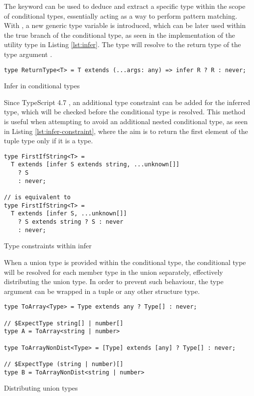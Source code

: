 The  keyword can be used to deduce and extract a specific type within the scope of conditional types, essentially acting as a way to perform pattern matching. With , a new generic type variable is introduced, which can be later used within the true branch of the conditional type, as seen in the implementation of the  utility type in Listing \ref{lst:infer}. The  type will resolve to the return type of the type argument .

\begin{listing}[ht]
  \begin{verbatim}
type ReturnType<T> = T extends (...args: any) => infer R ? R : never;
\end{verbatim}
  \caption{Infer in conditional types}\label{lst:infer}
\end{listing}

Since TypeScript 4.7 \cite{AnnouncingTypeScript4.7}, an additional type constraint can be added for the inferred type, which will be checked before the conditional type is resolved. This method is useful when attempting to avoid an additional nested conditional type, as seen in Listing \ref{lst:infer-constraint}, where the aim is to return the first element of the tuple type only if it is a  type.

\begin{listing}[ht]
  \begin{verbatim}
type FirstIfString<T> =
  T extends [infer S extends string, ...unknown[]]
    ? S
    : never;

// is equivalent to 
type FirstIfString<T> =
  T extends [infer S, ...unknown[]]
    ? S extends string ? S : never
    : never;
\end{verbatim}
  \caption{Type constraints within infer}\label{lst:infer-constraint}
\end{listing}

When a union type is provided within the conditional type, the conditional type will be resolved for each member type in the union separately, effectively distributing the union type. In order to prevent such behaviour, the type argument can be wrapped in a tuple or any other structure type.

\begin{listing}[ht]
  \begin{verbatim}
type ToArray<Type> = Type extends any ? Type[] : never;

// $ExpectType string[] | number[]
type A = ToArray<string | number> 

type ToArrayNonDist<Type> = [Type] extends [any] ? Type[] : never;

// $ExpectType (string | number)[]
type B = ToArrayNonDist<string | number> 
\end{verbatim}
  \caption{Distributing union types}\label{lst:distribute}
\end{listing}

